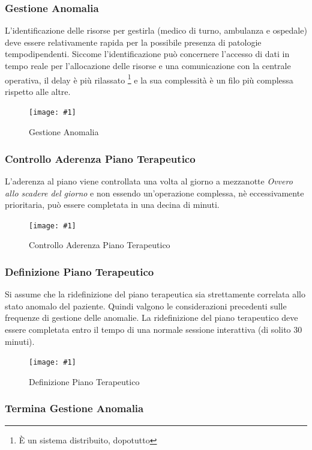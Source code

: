 \documentclass[a4paper,11pt,oneside, table]{article}
\newcommand{\putimage}[4] {
	\begin{figure}[H]
	    \centering
	    \texttt{[image: \#1]}
	    \caption{#2}\label{#3}
	\end{figure}
}
\begin{document}
\subsubsection{Gestione Anomalia}

L'identificazione delle risorse per gestirla (medico di turno, ambulanza e ospedale) deve essere relativamente rapida per la possibile presenza di patologie tempodipendenti.
Siccome l'identificazione pu\`o concernere l'accesso di dati in tempo reale per l'allocazione delle risorse e una comunicazione con la centrale operativa, il delay \`e pi\`u rilassato \footnote{\`E un sistema distribuito, dopotutto} e la sua complessit\`a \`e un filo pi\`u complessa rispetto alle altre.

\putimage{images/Diagramma delle Attivita'/Gestione Anomalia.png}{Gestione Anomalia}{png:act:gestione-anomalia}{1}

\subsubsection{Controllo Aderenza Piano Terapeutico}

L'aderenza al piano viene controllata una volta al giorno a mezzanotte \textit{Ovvero allo scadere del giorno} e non essendo un'operazione complessa, n\`e eccessivamente prioritaria, pu\`o essere completata in una decina di minuti.

\putimage{images/Diagramma delle Attivita'/Controllo Aderenza Piano Terapeutico.png}{Controllo Aderenza Piano Terapeutico}{png:act:controllo-aderenza-piano-terapeutico}{1}

\subsubsection{Definizione Piano Terapeutico}

Si assume che la ridefinizione del piano terapeutica sia strettamente correlata allo stato anomalo del paziente. Quindi valgono le considerazioni precedenti sulle frequenze di gestione delle anomalie.
La ridefinizione del piano terapeutico deve essere completata entro il tempo di una normale sessione interattiva (di solito 30 minuti).

\putimage{images/Diagramma delle Attivita'/Definizione Piano Terapeutico.png}{Definizione Piano Terapeutico}{png:act:definizione-piano-terapeutico}{1}

\subsubsection{Termina Gestione Anomalia}
\end{document}
